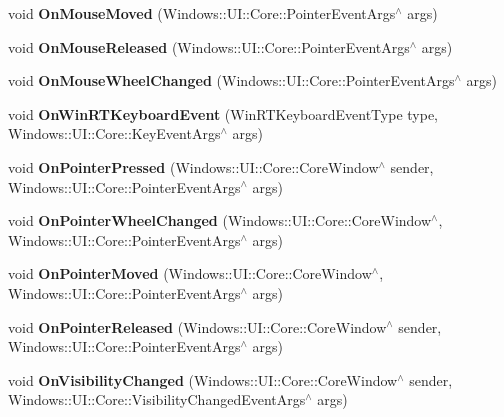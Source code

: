 \begin{DoxyCompactItemize}
void {\bfseries On\+Mouse\+Moved} (Windows\+::\+U\+I\+::\+Core\+::\+Pointer\+Event\+Args$^\wedge$ args)
\item 
\mbox{\label{classGLViewImpl_af285b57b58b5ba906922eca7daa48feb}} 
void {\bfseries On\+Mouse\+Released} (Windows\+::\+U\+I\+::\+Core\+::\+Pointer\+Event\+Args$^\wedge$ args)
\item 
\mbox{\label{classGLViewImpl_a227f3132e5752543a2e1e4511e60287b}} 
void {\bfseries On\+Mouse\+Wheel\+Changed} (Windows\+::\+U\+I\+::\+Core\+::\+Pointer\+Event\+Args$^\wedge$ args)
\item 
\mbox{\label{classGLViewImpl_af0cf17377bae738c5e4dd46fcdfa6223}} 
void {\bfseries On\+Win\+R\+T\+Keyboard\+Event} (Win\+R\+T\+Keyboard\+Event\+Type type, Windows\+::\+U\+I\+::\+Core\+::\+Key\+Event\+Args$^\wedge$ args)
\item 
\mbox{\label{classGLViewImpl_a0a5781a54e634c0f0d04e69e1b6662ed}} 
void {\bfseries On\+Pointer\+Pressed} (Windows\+::\+U\+I\+::\+Core\+::\+Core\+Window$^\wedge$ sender, Windows\+::\+U\+I\+::\+Core\+::\+Pointer\+Event\+Args$^\wedge$ args)
\item 
\mbox{\label{classGLViewImpl_aa86c988ee2ebe95e5060d3abe44cd1aa}} 
void {\bfseries On\+Pointer\+Wheel\+Changed} (Windows\+::\+U\+I\+::\+Core\+::\+Core\+Window$^\wedge$, Windows\+::\+U\+I\+::\+Core\+::\+Pointer\+Event\+Args$^\wedge$ args)
\item 
\mbox{\label{classGLViewImpl_a5109f2bfad20f8f9b950485d2736b8e7}} 
void {\bfseries On\+Pointer\+Moved} (Windows\+::\+U\+I\+::\+Core\+::\+Core\+Window$^\wedge$, Windows\+::\+U\+I\+::\+Core\+::\+Pointer\+Event\+Args$^\wedge$ args)
\item 
\mbox{\label{classGLViewImpl_a0f0c96ccea34bd16f0565d8589f32279}} 
void {\bfseries On\+Pointer\+Released} (Windows\+::\+U\+I\+::\+Core\+::\+Core\+Window$^\wedge$ sender, Windows\+::\+U\+I\+::\+Core\+::\+Pointer\+Event\+Args$^\wedge$ args)
\item 
\mbox{\label{classGLViewImpl_aa181daf36a89b2991dba384c00e77121}} 
void {\bfseries On\+Visibility\+Changed} (Windows\+::\+U\+I\+::\+Core\+::\+Core\+Window$^\wedge$ sender, Windows\+::\+U\+I\+::\+Core\+::\+Visibility\+Changed\+Event\+Args$^\wedge$ args)

\end{DoxyCompactItemize}
